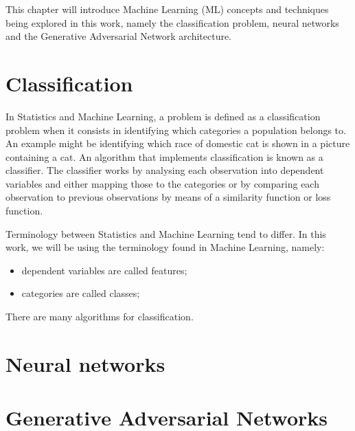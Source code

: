 
This chapter will introduce Machine Learning (ML) concepts and techniques being explored in this work, namely the classification problem, neural networks and the Generative Adversarial Network architecture.

\section{Classification}

In Statistics and Machine Learning, a problem is defined as a classification problem when it consists in identifying which categories a population belongs to. An example might be identifying which race of domestic cat is shown in a picture containing a cat. An algorithm that implements classification is known as a classifier. The classifier works by analysing each observation into dependent variables and either mapping those to the categories or by comparing each observation to previous observations by means of a similarity function or loss function. 

Terminology between Statistics and Machine Learning tend to differ. In this work, we will be using the terminology found in Machine Learning, namely:

\begin{itemize}
	\item dependent variables are called features;
	\item categories are called classes;
\end{itemize}

There are many algorithms for classification. 

\section{Neural networks}



\section{Generative Adversarial Networks}